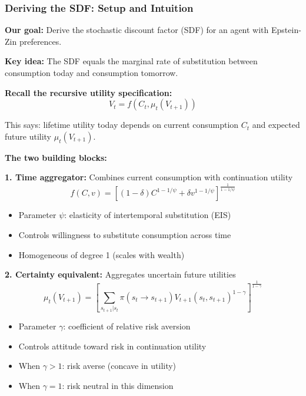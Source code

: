 \documentclass{beamer}
\begin{document}

\begin{frame}[allowframebreaks]
    \frametitle{Deriving the SDF: Setup and Intuition}
    
    \textbf{Our goal:} Derive the stochastic discount factor (SDF) for an agent with Epstein-Zin preferences.
    
    \textbf{Key idea:} The SDF equals the marginal rate of substitution between consumption today and consumption tomorrow.
    
    \textbf{Recall the recursive utility specification:}
    \begin{equation*}
        V_t = f(C_t, \mu_t(V_{t+1}))
    \end{equation*}
    
    This says: lifetime utility today depends on current consumption $C_t$ and expected future utility $\mu_t(V_{t+1})$.
    
    \framebreak
    
    \textbf{The two building blocks:}
    
    \textbf{1. Time aggregator:} Combines current consumption with continuation utility
    \begin{equation*}
        f(C, v) = \left[ (1-\delta)C^{1-1/\psi} + \delta v^{1-1/\psi} \right]^{\frac{1}{1-1/\psi}}
    \end{equation*}
    \begin{itemize}
        \item Parameter $\psi$: elasticity of intertemporal substitution (EIS)
        \item Controls willingness to substitute consumption across time
        \item Homogeneous of degree 1 (scales with wealth)
    \end{itemize}
    
    \framebreak
    
    \textbf{2. Certainty equivalent:} Aggregates uncertain future utilities
    \begin{equation*}
        \mu_t(V_{t+1}) = \left[ \sum_{s_{t+1}|s_t} \pi(s_t \to s_{t+1})V_{t+1}(s_t, s_{t+1})^{1-\gamma} \right]^{\frac{1}{1-\gamma}}
    \end{equation*}
    \begin{itemize}
        \item Parameter $\gamma$: coefficient of relative risk aversion
        \item Controls attitude toward risk in continuation utility
        \item When $\gamma > 1$: risk averse (concave in utility)
        \item When $\gamma = 1$: risk neutral in this dimension
    \end{itemize}
    

\end{frame}
\end{document}
